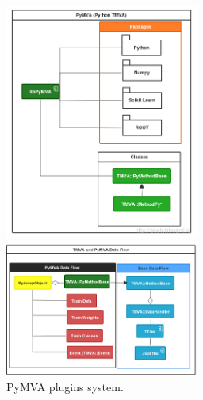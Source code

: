 \documentclass[a4paper]{jpconf}
\begin{document}
\begin{figure}[h]
\centering
\begin{minipage}{15pc}
\includegraphics[width=15pc]{img/pymvaplugins.png}
\caption{\label{pymvaplug}PyMVA plugins system.}
\end{minipage}\hspace{2pc}%
\begin{minipage}{15pc}
\includegraphics[width=15pc]{img/pymvadf.png}

\end{minipage}
\end{figure}
\end{document}
